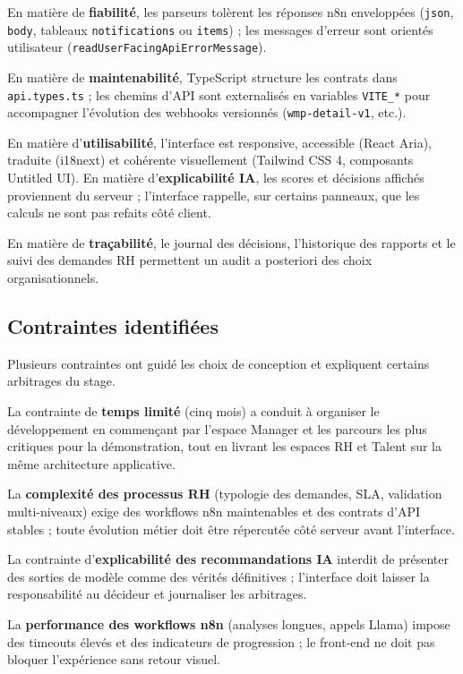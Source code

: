 En matière de \textbf{fiabilité}, les parseurs tolèrent les réponses n8n enveloppées (\texttt{json}, \texttt{body}, tableaux \texttt{notifications} ou \texttt{items}) ; les messages d'erreur sont orientés utilisateur (\texttt{readUserFacingApiErrorMessage}).

En matière de \textbf{maintenabilité}, TypeScript structure les contrats dans \texttt{api.types.ts} ; les chemins d'API sont externalisés en variables \texttt{VITE\_*} pour accompagner l'évolution des webhooks versionnés (\texttt{wmp-detail-v1}, etc.).

En matière d'\textbf{utilisabilité}, l'interface est responsive, accessible (React Aria), traduite (i18next) et cohérente visuellement (Tailwind CSS 4, composants Untitled UI). En matière d'\textbf{explicabilité IA}, les scores et décisions affichés proviennent du serveur ; l'interface rappelle, sur certains panneaux, que les calculs ne sont pas refaits côté client.

En matière de \textbf{traçabilité}, le journal des décisions, l'historique des rapports et le suivi des demandes RH permettent un audit a posteriori des choix organisationnels.

\subsection{Contraintes identifiées}

Plusieurs contraintes ont guidé les choix de conception et expliquent certains arbitrages du stage.

La contrainte de \textbf{temps limité} (cinq mois) a conduit à organiser le développement en commençant par l'espace Manager et les parcours les plus critiques pour la démonstration, tout en livrant les espaces RH et Talent sur la même architecture applicative.

La \textbf{complexité des processus RH} (typologie des demandes, SLA, validation multi-niveaux) exige des workflows n8n maintenables et des contrats d'API stables ; toute évolution métier doit être répercutée côté serveur avant l'interface.

La contrainte d'\textbf{explicabilité des recommandations IA} interdit de présenter des sorties de modèle comme des vérités définitives ; l'interface doit laisser la responsabilité au décideur et journaliser les arbitrages.

La \textbf{performance des workflows n8n} (analyses longues, appels Llama) impose des timeouts élevés et des indicateurs de progression ; le front-end ne doit pas bloquer l'expérience sans retour visuel.

